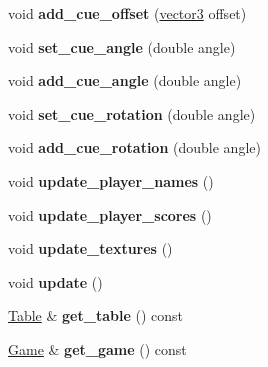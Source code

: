 \begin{DoxyCompactItemize}
\item 
\hypertarget{class_scene_a89506ee864890384d185a55ba0616400}{
void {\bfseries add\_\-cue\_\-offset} (\hyperlink{classvector3d}{vector3} offset)}
\label{class_scene_a89506ee864890384d185a55ba0616400}

\item 
\hypertarget{class_scene_aebab6c853ff69728e03bbaafc507b52a}{
void {\bfseries set\_\-cue\_\-angle} (double angle)}
\label{class_scene_aebab6c853ff69728e03bbaafc507b52a}

\item 
\hypertarget{class_scene_a9f345238a91df36bbd16c73ebd255bb2}{
void {\bfseries add\_\-cue\_\-angle} (double angle)}
\label{class_scene_a9f345238a91df36bbd16c73ebd255bb2}

\item 
\hypertarget{class_scene_a271a1101ae55be54f30acba3aa144ab4}{
void {\bfseries set\_\-cue\_\-rotation} (double angle)}
\label{class_scene_a271a1101ae55be54f30acba3aa144ab4}

\item 
\hypertarget{class_scene_ae771876980790c999cda2ebe9b86b6a8}{
void {\bfseries add\_\-cue\_\-rotation} (double angle)}
\label{class_scene_ae771876980790c999cda2ebe9b86b6a8}

\item 
\hypertarget{class_scene_acd688c1d559d0fb90f3f516be92904cd}{
void {\bfseries update\_\-player\_\-names} ()}
\label{class_scene_acd688c1d559d0fb90f3f516be92904cd}

\item 
\hypertarget{class_scene_a81612c1d04984f5b6e051e919ffbdae2}{
void {\bfseries update\_\-player\_\-scores} ()}
\label{class_scene_a81612c1d04984f5b6e051e919ffbdae2}

\item 
\hypertarget{class_scene_a2cfe167a40657402343db72609f17075}{
void {\bfseries update\_\-textures} ()}
\label{class_scene_a2cfe167a40657402343db72609f17075}

\item 
\hypertarget{class_scene_aa24c7e636c10e4e42650c1374b90bb80}{
void {\bfseries update} ()}
\label{class_scene_aa24c7e636c10e4e42650c1374b90bb80}

\item 
\hypertarget{class_scene_aa0260d417aeac068fd2412d35f2ea9b4}{
\hyperlink{class_table}{Table} \& {\bfseries get\_\-table} () const }
\label{class_scene_aa0260d417aeac068fd2412d35f2ea9b4}

\item 
\hypertarget{class_scene_a7cbb0a1d112b7918a0dea9e2d45c76c8}{
\hyperlink{class_game}{Game} \& {\bfseries get\_\-game} () const }
\label{class_scene_a7cbb0a1d112b7918a0dea9e2d45c76c8}


\end{DoxyCompactItemize}
